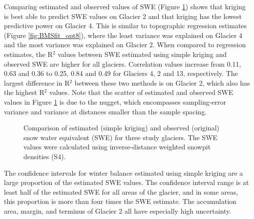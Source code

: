 \documentclass[12pt]{article}
\begin{document}
Comparing estimated and observed values of SWE (Figure \ref{fig:R2simplekrig}) shows that kriging is best able to predict SWE values on Glacier 2 and that kriging has the lowest predictive power on Glacier 4. This is similar to topographic regression estimates (Figure \ref{fig:BMSfit_opt8}), where the least variance was explained on Glacier 4 and the most variance was explained on Glacier 2. When compared to regression estimates, the R$^2$ values between SWE estimated using simple kriging and observed SWE are higher for all glaciers. Correlation values increase from 0.11, 0.63 and 0.36 to 0.25, 0.84 and 0.49 for Glaciers 4, 2 and 13, respectively. The largest difference in R$^2$ between these two methods is on Glacier 2, which also has the highest R$^2$ values. Note that the scatter of estimated and observed SWE values in Figure \ref{fig:R2simplekrig} is due to the nugget, which encompasses sampling-error variance and variance at distances smaller than the sample spacing.

\begin{figure}
	\caption{Comparison of estimated (simple kriging) and observed (original) snow water equivalent (SWE) for three study glaciers. The SWE values were calculated using inverse-distance weighted snowpit densities (S4).}
	\label{fig:R2simplekrig}
\end{figure}

The confidence intervals for winter balance estimated using simple kriging are a large proportion of the estimated SWE values. The confidence interval range is at least half of the estimated SWE for all areas of the glacier, and in some areas, this proportion is more than four times the SWE estimate. The accumulation area, margin, and terminus of Glacier 2 all have especially high uncertainty. 
\end{document}

